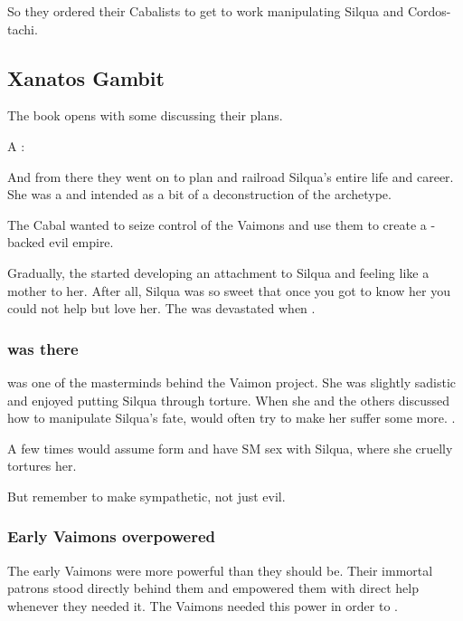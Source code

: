 So they ordered their Cabalists to get to work manipulating Silqua and Cordos-tachi. 









\subsection{\Resphan{} Xanatos Gambit}
The book opens with some \resphain{} discussing their plans. 

A \TiphredSerah{} \resvil: 

And from there they went on to plan and railroad Silqua's entire life and career. 
She was a  and intended as a bit of a deconstruction of the  archetype. 

The Cabal wanted to seize control of the Vaimons and use them to create a \resphan-backed evil empire. 

Gradually, the \resvil{} started developing an attachment to Silqua and feeling like a mother to her. 
After all, Silqua was so sweet that once you got to know her you could not help but love her. 
The \resvil{} was devastated when . 





\subsubsection{\Cishiel{} was there}
\Cishiel{} was one of the masterminds behind the Vaimon project. 
She was slightly sadistic and enjoyed putting Silqua through torture. 
When she and the others discussed how to manipulate Silqua's fate, \Cishiel{} would often try to make her suffer some more. 
. 

A few times \Cishiel{} would assume \human{} form and have SM sex with Silqua, where she cruelly tortures her. 

But remember to make \Cishiel{} sympathetic, not just evil. 





\subsubsection{Early Vaimons overpowered}
The early Vaimons were more powerful than they should be. 
Their immortal patrons stood directly behind them and empowered them with direct help whenever they needed it. 
The Vaimons needed this power in order to . 

